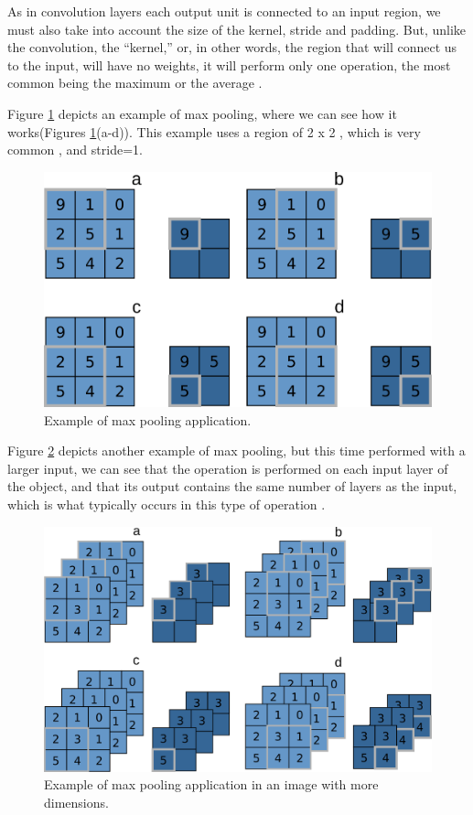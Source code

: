 As in convolution layers each output unit is connected to an input region, we must also take into account the size of the kernel, stride and padding. But, unlike the convolution, the “kernel,” or, in other words, the region that will connect us to the input, will have no weights, it will perform only one operation, the most common being the maximum or the average \cite{geron2019} .

Figure \ref{fig:figure121} depicts an example of max pooling, where we can see how it works(Figures \ref{fig:figure121}(a-d)). This example uses a region of 2 x 2 , which is very common \cite{adrian2017}, and stride=1.

\begin{figure}
    \centering
    \includegraphics[scale=0.30]{images/figure121.png}
    \caption{Example of max pooling application.}
    \label{fig:figure121}
\end{figure}

Figure \ref{fig:figure122} depicts another example of max pooling, but this time performed with a larger input, we can see that the operation is performed on each input layer of the object, and that its output contains the same number of layers as the input, which is what typically occurs in this type of operation \cite{geron2019}.

\begin{figure}
    \centering
    \includegraphics[scale=0.30]{images/figure122.png}
    \caption{Example of max pooling application in an image with more dimensions.}
    \label{fig:figure122}
\end{figure}

